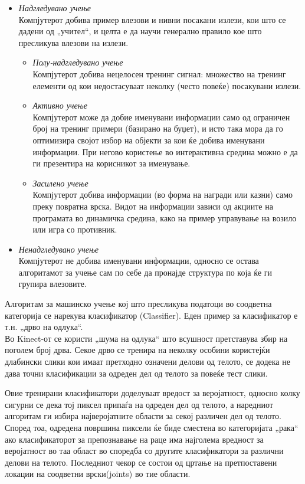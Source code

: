 \documentclass[12pt]{article}
\begin{document}
	\begin{itemize}
		\item \textit{Надгледувано учење}\\Компјутерот добива пример влезови и нивни посакани излези, кои што се дадени од „учител“, и целта е да научи генерално правило кое што пресликува влезови на излези.
    \begin{itemize}
      \item \textit{Полу-надгледувано учење}\\Компјутерот добива нецелосен тренинг сигнал: множество на тренинг елементи од кои недостасуваат неколку (често повеќе) посакувани излези.
      \item \textit{Активно учење}\\Компјутерот може да добие именувани информации само од ограничен број на тренинг примери (базирано на буџет), и исто така мора да го оптимизира својот избор на објекти за кои ќе добива именувани информации. При негово користење во интерактивна средина можно е да ги презентира на корисникот за именување.
      \item \textit{Засилено учење}\\Компјутерот добива информации (во форма на награди или казни) само преку повратна врска. Видот на информации зависи од акциите на програмата во динамичка средина, како на пример управување на возило или игра со противник.
      \end{itemize}
		\item \textit{Ненадгледувано учење}\\Компјутерот не добива именувани информации, односно се остава алгоритамот за учење сам по себе да пронајде структура по која ќе ги групира влезовите.
    \end{itemize}

  Алгоритам за машинско учење кој што пресликува податоци во соодветна категорија се нарекува класификатор (Classifier). Еден пример за класификатор е т.н. „дрво на одлука“.\\
  Во Kinect-от се користи „шума на одлука“ што всушност претставува збир на поголем број дрва. Секое дрво се тренира на неколку особини користејќи длабински слики кои имаат претходно означени делови од телото, се додека не дава точни класификации за одреден дел од телото за повеќе тест слики.

  Овие тренирани класификатори доделуваат вредост за веројатност, односно колку сигурни се дека тој пиксел припаѓа на одреден дел од телото, а наредниот алгоритам ги избира најверојатните области за секој различен дел од телото. Според тоа, одредена површина пиксели ќе биде сместена во категоријата „рака“ ако класификаторот за препознавање на раце има најголема вредност за веројатност во таа област во споредба со другите класификатори за различни делови на телото. Последниот чекор се состои од цртање на претпоставени локации на соодветни врски(joints) во тие области.
\end{document}
